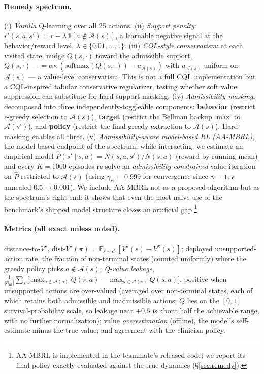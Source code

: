 \documentclass{article}
\newcommand{\Adm}{\mathcal{A}}
\newcommand{\dist}{\mathrm{dist}\text{-}V^\star}
\begin{document}
\paragraph{Remedy spectrum.}
(i) \emph{Vanilla} Q-learning over all 25 actions.
(ii) \emph{Support penalty}: $r'(s,a,s') = r - \lambda\,\mathbb{1}[a\notin\Adm(s)]$,
a learnable negative signal at the behavior/reward level, $\lambda\in\{0.01,\dots,1\}$.
(iii) \emph{CQL-style conservatism}: at each visited state, nudge $Q(s,\cdot)$ toward
the admissible support, $Q(s,\cdot)\!\mathrel{-}=\!\alpha\kappa\,(\mathrm{softmax}(Q(s,\cdot)) -
u_{\Adm(s)})$ with $u_{\Adm(s)}$ uniform on $\Adm(s)$ --- a value-level conservatism. This is not a full
CQL implementation but a CQL-inspired tabular conservative regularizer, testing
whether soft value suppression can substitute for hard support masking.
(iv) \emph{Admissibility masking}, decomposed into three independently-toggleable
components: \textbf{behavior} (restrict $\epsilon$-greedy selection to $\Adm(s)$),
\textbf{target} (restrict the Bellman backup $\max$ to $\Adm(s')$), and \textbf{policy}
(restrict the final greedy extraction to $\Adm(s)$). Hard masking enables all three.
(v) \emph{Admissibility-aware model-based RL (AA-MBRL)}, the model-based endpoint of
the spectrum: while interacting, we estimate an empirical model
$\hat P(s'\mid s,a){=}N(s,a,s')/N(s,a)$ (reward by running mean) and every
$K{=}1000$ episodes re-solve an \emph{admissibility-constrained} value iteration on
$\hat P$ restricted to $\Adm(s)$ (using $\gamma_{\mathrm{vi}}{=}0.999$ for
convergence since $\gamma{=}1$; $\epsilon$ annealed $0.5{\to}0.001$). We include
AA-MBRL not as a proposed algorithm but as the spectrum's right end: it shows that
even the most naive use of the benchmark's shipped model structure closes an
artificial gap.\footnote{AA-MBRL is implemented in the teammate's released code; we report its final
policy exactly evaluated against the true dynamics (\S\ref{sec:remedy}).}

\paragraph{Metrics (all exact unless noted).}
distance-to-$V^\star$, $\dist(\pi)=\mathbb{E}_{s\sim d_0}[V^\star(s)-V^\pi(s)]$;
deployed unsupported-action rate, the fraction of non-terminal states (counted
uniformly) where the greedy policy picks $a\notin\Adm(s)$; \emph{Q-value leakage},
$\frac{1}{|\mathcal{S}_{\mathrm{nt}}|}\sum_s\!\big[\max_{a\notin\Adm(s)}Q(s,a)-
\max_{a\in\Adm(s)}Q(s,a)\big]$, positive when unsupported actions are over-valued
(averaged over non-terminal states, each of which retains both admissible and
inadmissible actions; $Q$ lies on the $[0,1]$ survival-probability scale, so leakage
near $+0.5$ is about half the achievable range, with no further normalization);
value \emph{overestimation} (offline), the model's self-estimate minus the true
value; and agreement with the clinician policy.
\end{document}
